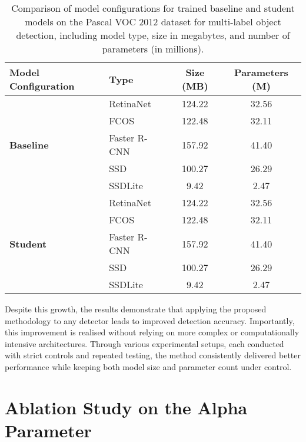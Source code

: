 \begin{table}[!ht]
    \centering
    \begin{tabular}{llcc}
        \toprule
        \textbf{Model Configuration} & \textbf{Type} & \textbf{Size (MB)} & \textbf{Parameters (M)} \\
        \midrule
        \multirow{5}{*}{\textbf{Baseline}} 
            & RetinaNet     & 124.22 & 32.56 \\
            & FCOS          & 122.48 & 32.11 \\
            & Faster R-CNN  & 157.92 & 41.40 \\
            & SSD           & 100.27 & 26.29 \\
            & SSDLite       & 9.42   & 2.47 \\
        \midrule
        \multirow{5}{*}{\textbf{Student}} 
            & RetinaNet     & 124.22 & 32.56 \\
            & FCOS          & 122.48 & 32.11 \\
            & Faster R-CNN  & 157.92 & 41.40 \\
            & SSD           & 100.27 & 26.29 \\
            & SSDLite       & 9.42   & 2.47 \\
        \bottomrule
    \end{tabular}
    \caption{Comparison of model configurations for trained baseline and student models on the Pascal VOC 2012 dataset for multi-label object detection, including model type, size in megabytes, and number of parameters (in millions).}
    \label{tab:model_configs_pascal_voc}
\end{table}

Despite this growth, the results demonstrate that applying the proposed methodology to any detector leads to improved detection accuracy. Importantly, this improvement is realised without relying on more complex or computationally intensive architectures. Through various experimental setups, each conducted with strict controls and repeated testing, the method consistently delivered better performance while keeping both model size and parameter count under control.



\section{Ablation Study on the Alpha Parameter}
\label{sec:5_alpha_exp}

